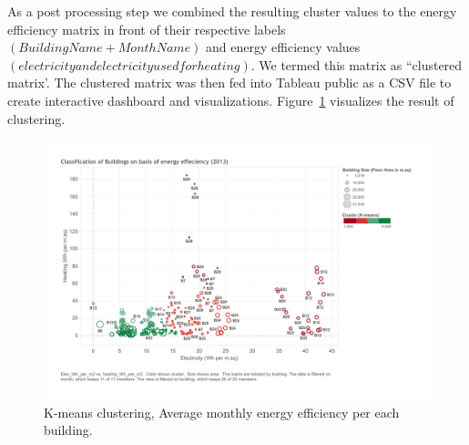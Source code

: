 As a post processing step we combined the resulting cluster values to the energy efficiency matrix in front of their respective labels \((Building Name + Month Name)\) and energy efficiency values \((electricity and electricity used for heating)\). We termed this matrix as  ``clustered matrix'. The clustered matrix was then fed into Tableau public as a CSV file to create interactive dashboard and visualizations. Figure~\ref{fig:kmeans} visualizes the result of clustering.  

\begin{figure}[!ht]
    \begin{center}
      \includegraphics[width=\textwidth]{images/kmeans.pdf}
      \caption{K-means clustering, Average monthly energy efficiency per each building.}
      \label{fig:kmeans}
    \end{center}
\end{figure} 

